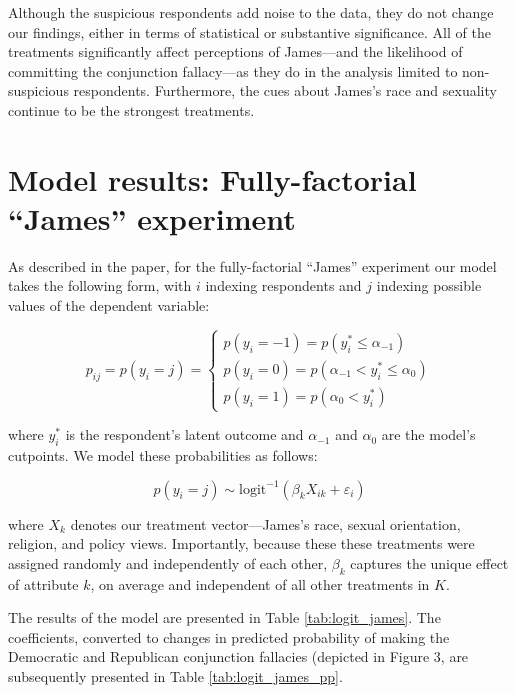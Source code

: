 \documentclass[12pt, letterpaper]{article}
\begin{document}
Although the suspicious respondents add noise to the data, they do not change our findings, either in terms of statistical or substantive significance. All of the treatments significantly affect perceptions of James---and the likelihood of committing the conjunction fallacy---as they do in the analysis limited to non-suspicious respondents. Furthermore, the cues about James's race and sexuality continue to be the strongest treatments.

\clearpage

\section{Model results: Fully-factorial ``James'' experiment} \label{si:james_ff_model}

As described in the paper, for the fully-factorial ``James'' experiment our model takes the following form, with $i$ indexing respondents and $j$ indexing possible values of the dependent variable:

\begin{equation}
p_{ij} = p(y_{i} = j) =
    \begin{cases}
p(y_{i} = -1) = p(y_{i}^{*} \leq \alpha_{-1}) \\
p(y_{i} = 0) = p(\alpha_{-1} < y_{i}^{*} \leq \alpha_{0}) \\
p(y_{i} = 1) = p(\alpha_{0} < y_{i}^{*})
    \end{cases}
\end{equation}

\noindent where $y^{*}_{i}$ is the respondent's latent outcome and $\alpha_{-1}$ and $\alpha_{0}$ are the model's cutpoints. We model these probabilities as follows:

\begin{equation}
p(y_{i} = j) \sim \text{logit}^{-1}(\beta_{k}X_{ik} + \varepsilon_{i})
\end{equation}

\noindent where $X_{k}$ denotes our treatment vector---James's race, sexual orientation, religion, and policy views. Importantly, because these these treatments were assigned randomly and independently of each other, $\beta_{k}$ captures the unique effect of attribute $k$, on average and independent of all other treatments in $K$.

The results of the model are presented in Table \ref{tab:logit_james}. The coefficients, converted to changes in predicted probability of making the Democratic and Republican conjunction fallacies (depicted in Figure 3, are subsequently presented in Table \ref{tab:logit_james_pp}.
\end{document}
